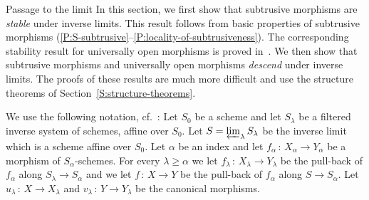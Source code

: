 \documentclass[a4paper,twoside,11pt]{amsart}[2009/07/02] %
\newcommand{\pref}[1]{\eqref{#1}}
\newcommand{\map}[3]{#1\,:\, #2\rightarrow #3}
\begin{document}
\begin{section}{Passage to the limit}\label{S:limit}
%
In this section, we first show that subtrusive morphisms are \emph{stable}
under inverse limits. This result follows from basic properties of subtrusive
morphisms (\ref{P:S-subtrusive}--\ref{P:locality-of-subtrusiveness}).
The corresponding stability result for universally open morphisms is proved
in~\cite[Prop.~8.10.1]{egaIV}. We then show that subtrusive morphisms and
universally open morphisms \emph{descend} under inverse limits. The proofs of
these results are much more difficult and use the structure theorems of
Section~\ref{S:structure-theorems}.


\begin{notation}\label{N:limit}
We use the following notation, cf.~\cite[\S8]{egaIV}: Let $S_0$ be a scheme and
let $S_\lambda$ be a filtered inverse system of schemes, affine over $S_0$. Let
$S=\varprojlim_\lambda S_\lambda$ be the inverse limit which is a scheme
affine over $S_0$. Let $\alpha$ be an index and let
$\map{f_\alpha}{X_\alpha}{Y_\alpha}$ be a morphism of $S_\alpha$-schemes. For
every $\lambda\geq\alpha$ we let $\map{f_\lambda}{X_\lambda}{Y_\lambda}$ be the
pull-back of $f_\alpha$ along $S_\lambda\to S_\alpha$ and we let
$\map{f}{X}{Y}$ be the pull-back of $f_\alpha$ along $S\to S_\alpha$. Let
$\map{u_\lambda}{X}{X_\lambda}$ and $\map{v_\lambda}{Y}{Y_\lambda}$ be the
canonical morphisms.
\end{notation}



\end{section}
\end{document}
